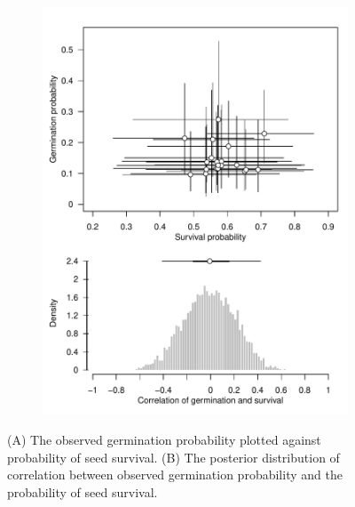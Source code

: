 \documentclass[12pt, oneside, titlepage]{article}   	%
\begin{document}
{ \begin{figure}
\centering
\begin{subfigure}[h]{.65\textwidth}
\centering
       \includegraphics[page=1,width=1\textwidth]{../figures/analysis/correlation-germ-surv.pdf}  
\end{subfigure}
 \caption{ (A) The observed germination probability plotted against probability of seed survival. (B) The posterior distribution of correlation between observed germination probability and the probability of seed survival. }
  \label{fig:correlation-germ-surv}
 \end{figure}
 

}
\end{document}
